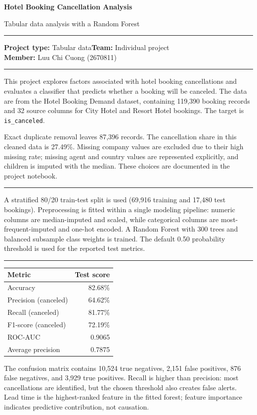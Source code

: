 \documentclass[11pt,a4paper]{article}
\newcommand{\sectiontitle}[1]{\vspace{5pt}{\large\bfseries\color{teal}#1}\par\vspace{2pt}\hrule\vspace{6pt}}
\begin{document}
{\LARGE\bfseries Hotel Booking Cancellation Analysis}\par
{\large Tabular data analysis with a Random Forest}\vspace{8pt}\hrule\vspace{8pt}
\textbf{Project type:} Tabular data\hfill\textbf{Team:} Individual project\\
\textbf{Member:} Luu Chi Cuong (2670811)

\sectiontitle{Problem and dataset}
This project explores factors associated with hotel booking cancellations and evaluates a classifier that predicts whether a booking will be canceled. The data are from the Hotel Booking Demand dataset, containing 119,390 booking records and 32 source columns for City Hotel and Resort Hotel bookings. The target is \texttt{is\_canceled}.

Exact duplicate removal leaves 87,396 records. The cancellation share in this cleaned data is 27.49\%. Missing company values are excluded due to their high missing rate; missing agent and country values are represented explicitly, and children is imputed with the median. These choices are documented in the project notebook.

\sectiontitle{Method}
A stratified 80/20 train-test split is used (69,916 training and 17,480 test bookings). Preprocessing is fitted within a single modeling pipeline: numeric columns are median-imputed and scaled, while categorical columns are most-frequent-imputed and one-hot encoded. A Random Forest with 300 trees and balanced subsample class weights is trained. The default 0.50 probability threshold is used for the reported test metrics.

\sectiontitle{Test results}
\begin{center}
\begin{tabular}{lr}
\toprule
Metric & Test score \\
\midrule
Accuracy & 82.68\% \\
Precision (canceled) & 64.62\% \\
Recall (canceled) & 81.77\% \\
F1-score (canceled) & 72.19\% \\
ROC-AUC & 0.9065 \\
Average precision & 0.7875 \\
\bottomrule
\end{tabular}
\end{center}
The confusion matrix contains 10,524 true negatives, 2,151 false positives, 876 false negatives, and 3,929 true positives. Recall is higher than precision: most cancellations are identified, but the chosen threshold also creates false alerts. Lead time is the highest-ranked feature in the fitted forest; feature importance indicates predictive contribution, not causation.
\end{document}
